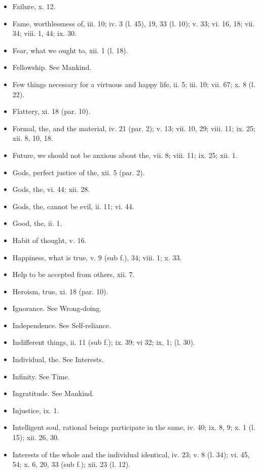 \begin{itemize}[leftmargin=*]
\setlength\itemsep{0em}
\item
  Failure, x. 12.
\item
  Fame, worthlessness of, iii. 10; iv. 3 (l. 45), 19, 33 (l. 10); v. 33;
  vi. 16, 18; vii. 34; viii. 1, 44; ix. 30.
\item
  Fear, what we ought to, xii. 1 (l. 18).
\item
  Fellowship. See Mankind.
\item
  Few things necessary for a virtuous and happy life, ii. 5; iii. 10;
  vii. 67; x. 8 (l. 22).
\item
  Flattery, xi. 18 (par. 10).
\item
  Formal, the, and the material, iv. 21 (par. 2); v. 13; vii. 10, 29;
  viii. 11; ix. 25; xii. 8, 10, 18.
\item
  Future, we should not be anxious about the, vii. 8; viii. 11; ix. 25;
  xii. 1.
\end{itemize}

\begin{itemize}[leftmargin=*]
\setlength\itemsep{0em}
\item
  Gods, perfect justice of the, xii. 5 (par. 2).
\item
  Gods, the, vi. 44; xii. 28.
\item
  Gods, the, cannot be evil, ii. 11; vi. 44.
\item
  Good, the, ii. 1.
\end{itemize}

\begin{itemize}[leftmargin=*]
\setlength\itemsep{0em}
\item
  Habit of thought, v. 16.
\item
  Happiness, what is true, v. 9 (sub f.), 34; viii. 1; x. 33.
\item
  Help to be accepted from others, xii. 7.
\item
  Heroism, true, xi. 18 (par. 10).
\end{itemize}

\begin{itemize}[leftmargin=*]
\setlength\itemsep{0em}
\item
  Ignorance. See Wrong-doing.
\item
  Independence. See Self-reliance.
\item
  Indifferent things, ii. 11 (sub f.); ix. 39; vi 32; ix, 1; (l. 30).
\item
  Individual, the. See Interests.
\item
  Infinity. See Time.
\item
  Ingratitude. See Mankind.
\item
  Injustice, ix. 1.
\item
  Intelligent soul, rational beings participate in the same, iv. 40; ix.
  8, 9; x. 1 (l. 15); xii. 26, 30.
\item
  Interests of the whole and the individual identical, iv. 23; v. 8 (l.
  34); vi. 45, 54; x. 6, 20, 33 (sub f.); xii. 23 (l. 12).
\end{itemize}

